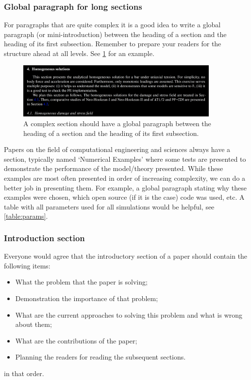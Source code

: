 \documentclass[authoryear,3p,times,preprint,review,fleqn]{elsarticle}
\numberwithin{equation}{section}
\theoremstyle{remark}
\begin{document}
\subsubsection{Global paragraph for long sections}\label{sec:global-para}

For paragraphs that are quite complex it is a good idea to write a global paragraph (or mini-introduction) between the heading of a section and the heading of its first subsection. Remember to prepare your readers for the structure ahead at all levels. See \cref{fig:section} for an example. 


\begin{figure}[!h]
  \centering
  \includegraphics[width=0.9\textwidth]{section}
  \caption{A complex section should have a global paragraph between the heading of a section and the heading of its first subsection.}
  \label{fig:section}
\end{figure}


Papers on the field of computational engineering and sciences always have a section, typically named `Numerical Examples' where some tests are presented to demonstrate the performance of the model/theory presented. While these examples are most often presented in order of increasing complexity, we can do a better job in presenting them. For example, a global paragraph stating why these examples were chosen, which open source (if it is the case) code was used, etc. A table with all parameters used for all simulations would be helpful, see  \cref{table:params}.

\subsubsection{Introduction section}\label{sec:introduction-part}

Everyone would agree that the introductory section of a paper should contain the following items:

\begin{itemize}
\item What the problem that the paper is solving;
\item Demonstration the importance of that problem;
\item What are the current approaches to solving this problem and what is wrong about them;
\item What are the contributions of the paper; 
\item Planning  the readers for reading the subsequent sections.
\end{itemize}
in that order.
\end{document}
